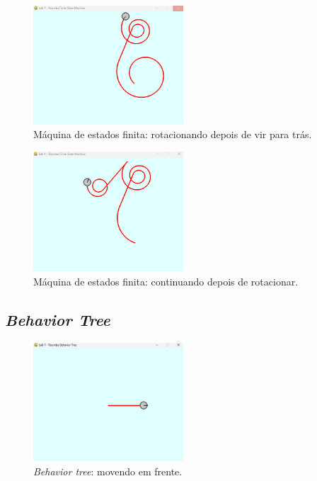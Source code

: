 \documentclass[brazil, 12pt]{article}
\begin{document}
\begin{figure}[H]
	\centering
	\includegraphics[width=0.5\textwidth]{FSM_back_rotate} %
	\caption{Máquina de estados finita: rotacionando depois de vir para trás.} %
	\label{fig:FSM_back_rotate}  %
\end{figure}

\begin{figure}[H]
	\centering
	\includegraphics[width=0.5\textwidth]{FSM_continue} %
	\caption{Máquina de estados finita: continuando depois de rotacionar.} %
	\label{fig:FSM_continue}  %
\end{figure}

\subsection{\textit{Behavior Tree}}
\begin{figure}[H]
	\centering
	\includegraphics[width=0.5\textwidth]{BT_forward} %
	\caption{\textit{Behavior tree}: movendo em frente.} %
	\label{fig:BT_forward}  %
\end{figure}
\end{document}
